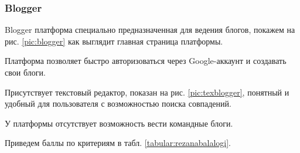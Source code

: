 \pagebreak

\subsubsection{Blogger}

Blogger платформа специально предназначенная для ведения блогов, покажем на рис. \ref{pic:blogger} как выглядит главная страница платформы.


Платформа позволяет быстро авторизоваться через Google-аккаунт и создавать свои блоги.

Присутствует текстовый редактор, показан на рис. \ref{pic:texblogger}, понятный и удобный для пользователя с возможностью поиска совпадений.


У платформы отсутствует возможность вести командные блоги.

Приведем баллы по критериям в табл. \ref{tabular:rezanabalalogi}.

